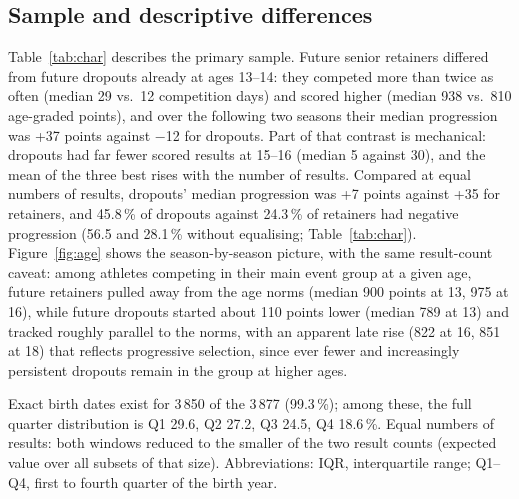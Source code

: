 \documentclass[12pt,a4paper]{article}
\begin{document}
\subsection{Sample and descriptive differences}

Table~\ref{tab:char} describes the primary sample. Future senior retainers differed from future dropouts already at ages 13--14: they competed more than twice as often (median 29 vs.\ 12 competition days) and scored higher (median 938 vs.\ 810 age-graded points), and over the following two seasons their median progression was +37 points against $-$12 for dropouts. Part of that contrast is mechanical: dropouts had far fewer scored results at 15--16 (median 5 against 30), and the mean of the three best rises with the number of results. Compared at equal numbers of results, dropouts' median progression was +7 points against +35 for retainers, and 45.8\,\% of dropouts against 24.3\,\% of retainers had negative progression (56.5 and 28.1\,\% without equalising; Table~\ref{tab:char}). Figure~\ref{fig:age} shows the season-by-season picture, with the same result-count caveat: among athletes competing in their main event group at a given age, future retainers pulled away from the age norms (median 900 points at 13, 975 at 16), while future dropouts started about 110 points lower (median 789 at 13) and tracked roughly parallel to the norms, with an apparent late rise (822 at 16, 851 at 18) that reflects progressive selection, since ever fewer and increasingly persistent dropouts remain in the group at higher ages.

\begin{table}[H]
\centering
\caption{Characteristics of the primary landmark sample (born 1998--2005), by senior-retention status.}
\label{tab:char}
\small
\resizebox{\textwidth}{!}{}
\vspace{0.3em}
\parbox{0.92\textwidth}{\footnotesize Exact birth dates exist for 3\,850 of the 3\,877 (99.3\,\%); among these, the full quarter distribution is Q1 29.6, Q2 27.2, Q3 24.5, Q4 18.6\,\%. Equal numbers of results: both windows reduced to the smaller of the two result counts (expected value over all subsets of that size). Abbreviations: IQR, interquartile range; Q1--Q4, first to fourth quarter of the birth year.}
\end{table}
\end{document}
